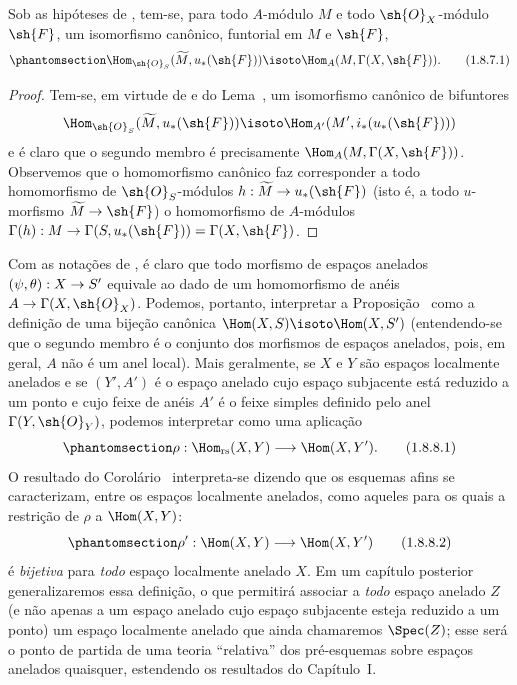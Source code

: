 \documentclass[oneside]{amsart}
\makeatletter
\newcommand{\ega@arrow}[2]{\mathchoice{#1}{#2}{#2}{#2}}
\renewcommand{\to}{\ega@arrow{\longrightarrow}{\rightarrow}}
\let\EGAOriginalLabel\label
\renewcommand{\label}[1]{\phantomsection\EGAOriginalLabel{#1}}
\makeatother
\begin{document}
\begin{corollary}[1.8.7]
\label{I.1.8.7}
Sob as hipóteses de , tem-se, para todo $A$-módulo $M$
e todo $\sh{O}_X$-módulo $\sh{F}$, um isomorfismo canônico, funtorial
em $M$ e $\sh{F}$,
\[
  \label{I.1.8.7.1}
  \Hom_{\sh{O}_S}(\widetilde{M},u_*(\sh{F}))\isoto\Hom_A(M,\Gamma(X,\sh{F})).
  \tag{1.8.7.1}
\]
\end{corollary}

\begin{proof}
Tem-se, em virtude de  e do Lema~, um
isomorfismo canônico de bifuntores
\[
  \Hom_{\sh{O}_S}(\widetilde{M},u_*(\sh{F}))\isoto\Hom_{A'}(M',i_*(u_*(\sh{F})))
\]
e é claro que o segundo membro é precisamente
$\Hom_A(M,\Gamma(X,\sh{F}))$.
Observemos que o homomorfismo canônico  faz corresponder
a todo homomorfismo de $\sh{O}_S$-módulos
$h:\widetilde{M}\to u_*(\sh{F})$ (isto é, a todo $u$-morfismo
$\widetilde{M}\to\sh{F}$) o homomorfismo de $A$-módulos
$\Gamma(h):M\to\Gamma(S,u_*(\sh{F}))=\Gamma(X,\sh{F})$.
\end{proof}

\begin{env}[1.8.8]
\label{I.1.8.8}
Com as notações de , é claro  que todo
morfismo de espaços anelados $(\psi,\theta):X\to S'$ equivale ao dado de
um homomorfismo de anéis $A\to\Gamma(X,\sh{O}_X)$.
Podemos, portanto, interpretar a Proposição~ como a
definição de uma bijeção canônica
$\Hom(X,S)\isoto\Hom(X,S')$ (entendendo-se que o segundo membro é o
conjunto dos morfismos de espaços anelados, pois, em geral, $A$ não é um
anel local).
Mais geralmente, se $X$ e $Y$ são espaços localmente anelados e se
$(Y',A')$ é o espaço anelado cujo espaço subjacente está reduzido a um
ponto e cujo feixe de anéis $A'$ é o feixe simples definido pelo anel
$\Gamma(Y,\sh{O}_Y)$, podemos interpretar  como uma
aplicação
\[
  \label{I.1.8.8.1}
  \rho:\Hom_\text{rs}(X,Y)\to\Hom(X,Y').
  \tag{1.8.8.1}
\]
O resultado do Corolário~ interpreta-se dizendo que os
esquemas afins se caracterizam, entre os espaços localmente anelados,
como aqueles para os quais a restrição de $\rho$ a
$\Hom(X,Y)$:
\[
  \label{I.1.8.8.2}
  \rho':\Hom(X,Y)\to\Hom(X,Y')
  \tag{1.8.8.2}
\]
é \emph{bijetiva} para \emph{todo} espaço localmente anelado $X$.
Em um capítulo posterior generalizaremos essa definição, o que permitirá
associar a \emph{todo} espaço anelado $Z$ (e não apenas a um espaço
anelado cujo espaço subjacente esteja reduzido a um ponto) um espaço
localmente anelado que ainda chamaremos $\Spec(Z)$;
esse será o ponto de partida de uma teoria ``relativa'' dos pré-esquemas
sobre espaços anelados quaisquer, estendendo os resultados do
Capítulo~I.
\end{env}
\end{document}
